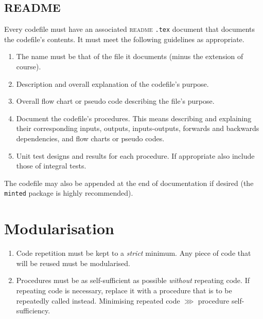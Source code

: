 \subsection{README}\label{c:best_practices:s:documentation:ss:readme}
Every codefile must have an associated \textsc{readme} \texttt{.tex} document that documents the codefile's contents. It must meet the following guidelines as appropriate.
\begin{enumerate}
	\item The name must be that of the file it documents (minus the extension of course).
	\item Description and overall explanation of the codefile's purpose.
	\item Overall flow chart or pseudo code describing the file's purpose.
	\item Document the codefile's procedures. This means describing and explaining their corresponding inputs, outputs, inputs-outputs, forwards and backwards dependencies, and flow charts or pseudo codes.
	\item Unit test designs and results for each procedure. If appropriate also include those of integral tests.
\end{enumerate}
The codefile may also be appended at the end of documentation if desired (the \texttt{minted} package is highly recommended).
%
\section{Modularisation}\label{c:best_practices:s:modularisation}
\begin{enumerate}
	\item Code repetition must be kept to a \emph{strict} minimum. Any piece of code that will be reused must be modularised.
	\item Procedures must be as self-sufficient as possible \emph{without} repeating code. If repeating code is necessary, replace it with a procedure that is to be repeatedly called instead. Minimising repeated code $\ggg$ procedure self-sufficiency.
\end{enumerate}
%
